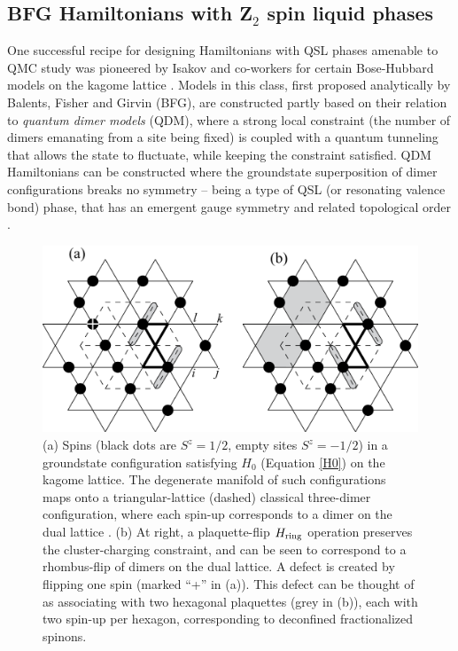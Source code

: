 \documentclass[range]{ar2e}
\begin{document}
\subsection{BFG Hamiltonians with Z$_2$ spin liquid phases}


One successful recipe for designing Hamiltonians with QSL phases amenable to QMC study was pioneered by Isakov and co-workers for certain Bose-Hubbard models on the kagome lattice \cite{Isakov1, Isakov2, TopoEE}.  Models in this class, first proposed analytically by Balents, Fisher and Girvin \cite{BFG} (BFG),
are constructed partly based on their relation to {\it quantum dimer models} (QDM), where a strong local constraint (the number of dimers emanating from a site being fixed) is coupled with a quantum tunneling that allows the state to fluctuate, while keeping the constraint satisfied.  QDM Hamiltonians can be constructed where the groundstate superposition of dimer configurations breaks no symmetry -- being a type of QSL (or resonating valence bond) phase, that has an emergent gauge symmetry and related topological order \cite{Misguich1}.


\begin{figure}
\centerline{\includegraphics[width=4.5in]{kagome}}
  \caption{ (a) Spins (black dots are $S^z = 1/2$, empty sites $S^z = -1/2$) in a groundstate configuration satisfying $H_0$ (Equation \ref{H0}) on the kagome lattice.  The degenerate manifold of such configurations maps onto a triangular-lattice (dashed) classical three-dimer configuration, where each spin-up corresponds to a dimer on the dual lattice \cite{BFG}.  (b) At right, a plaquette-flip $H_{\rm ring}$ operation preserves the cluster-charging constraint, and can be seen to correspond to a rhombus-flip of dimers on the dual lattice.  A defect is created by flipping one spin (marked ``+'' in (a)).  This defect can be thought of as associating with two hexagonal plaquettes (grey in (b)), each with two spin-up per hexagon, corresponding to deconfined fractionalized spinons.} \label{kag_fig}
\end{figure}
\end{document}
